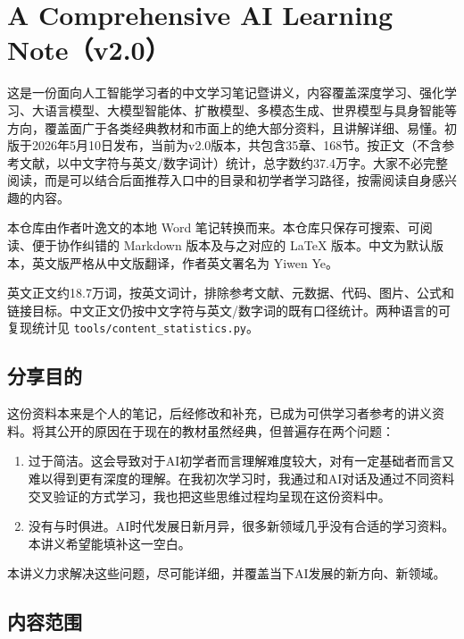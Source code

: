 \hypertarget{a-comprehensive-ai-learning-notev2.0}{%
\chapter{A Comprehensive AI Learning Note（v2.0）}\label{a-comprehensive-ai-learning-notev2.0}}

这是一份面向人工智能学习者的中文学习笔记暨讲义，内容覆盖深度学习、强化学习、大语言模型、大模型智能体、扩散模型、多模态生成、世界模型与具身智能等方向，覆盖面广于各类经典教材和市面上的绝大部分资料，且讲解详细、易懂。初版于2026年5月10日发布，当前为v2.0版本，共包含35章、168节。按正文（不含参考文献，以中文字符与英文/数字词计）统计，总字数约37.4万字。大家不必完整阅读，而是可以结合后面推荐入口中的目录和初学者学习路径，按需阅读自身感兴趣的内容。

本仓库由作者叶逸文的本地 Word 笔记转换而来。本仓库只保存可搜索、可阅读、便于协作纠错的 Markdown 版本及与之对应的 LaTeX 版本。中文为默认版本，英文版严格从中文版翻译，作者英文署名为 Yiwen Ye。

英文正文约18.7万词，按英文词计，排除参考文献、元数据、代码、图片、公式和链接目标。中文正文仍按中文字符与英文/数字词的既有口径统计。两种语言的可复现统计见 \texttt{tools/content\_statistics.py}。

\hypertarget{ux5206ux4eabux76eeux7684}{%
\section{分享目的}\label{ux5206ux4eabux76eeux7684}}

这份资料本来是个人的笔记，后经修改和补充，已成为可供学习者参考的讲义资料。将其公开的原因在于现在的教材虽然经典，但普遍存在两个问题：

\begin{enumerate}
\def\labelenumi{\arabic{enumi}.}
\item
  过于简洁。这会导致对于AI初学者而言理解难度较大，对有一定基础者而言又难以得到更有深度的理解。在我初次学习时，我通过和AI对话及通过不同资料交叉验证的方式学习，我也把这些思维过程均呈现在这份资料中。
\item
  没有与时俱进。AI时代发展日新月异，很多新领域几乎没有合适的学习资料。本讲义希望能填补这一空白。
\end{enumerate}

本讲义力求解决这些问题，尽可能详细，并覆盖当下AI发展的新方向、新领域。

\hypertarget{ux5185ux5bb9ux8303ux56f4}{%
\section{内容范围}\label{ux5185ux5bb9ux8303ux56f4}}

